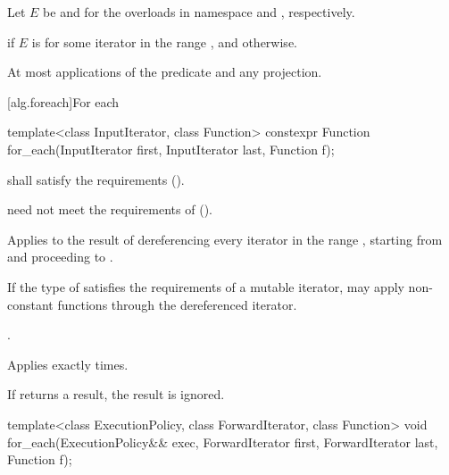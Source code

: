 \begin{itemdescr}
\pnum
Let $E$ be  and 
for the overloads in namespace  and , respectively.

\pnum
\returns
{} if $E$ is  for some iterator 
in the range , and  otherwise.

\pnum
\complexity At most  applications of the predicate
and any projection.
\end{itemdescr}

[alg.foreach]{For each}

%
\begin{itemdecl}
template<class InputIterator, class Function>
  constexpr Function for_each(InputIterator first, InputIterator last, Function f);
\end{itemdecl}

\begin{itemdescr}
\pnum
\requires {} shall satisfy the
 requirements ().
\begin{note}  need not meet the requirements of
 (). \end{note}

\pnum
\effects
Applies
 to the result of dereferencing every iterator in the range
,
starting from
and proceeding to
.
\begin{note} If the type of  satisfies the
requirements of a mutable iterator,  may apply non-constant
functions through the dereferenced iterator.\end{note}

\pnum
\returns
{}.

\pnum
\complexity
Applies 
exactly
times.

\pnum
\remarks
If  returns a result, the result is ignored.
\end{itemdescr}

%
\begin{itemdecl}
template<class ExecutionPolicy, class ForwardIterator, class Function>
  void for_each(ExecutionPolicy&& exec,
                ForwardIterator first, ForwardIterator last,
                Function f);
\end{itemdecl}

